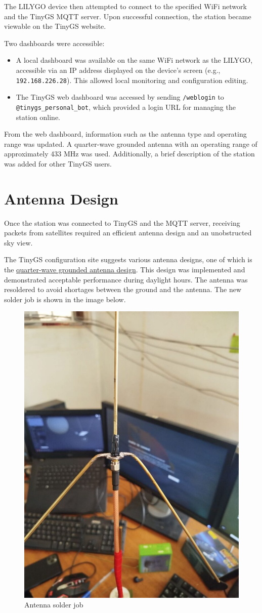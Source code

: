 \documentclass[12pt,a4paper]{article}
\begin{document}
The LILYGO device then attempted to connect to the specified WiFi network and the TinyGS MQTT server. Upon successful connection, the station became viewable on the TinyGS website.

Two dashboards were accessible:
\begin{itemize}
    \item A local dashboard was available on the same WiFi network as the LILYGO, accessible via an IP address displayed on the device's screen (e.g., \texttt{192.168.226.28}). This allowed local monitoring and configuration editing.
    \item The TinyGS web dashboard was accessed by sending \texttt{/weblogin} to \texttt{@tinygs\_personal\_bot}, which provided a login URL for managing the station online.
\end{itemize}

From the web dashboard, information such as the antenna type and operating range was updated. A quarter-wave grounded antenna with an operating range of approximately 433 MHz was used. Additionally, a brief description of the station was added for other TinyGS users.

\section{Antenna Design}
Once the station was connected to TinyGS and the MQTT server, receiving packets from satellites required an efficient antenna design and an unobstructed sky view.

The TinyGS configuration site suggests various antenna designs, one of which is the \href{http://www.n1gy.com/simple-ground-plane-antennas.html}{quarter-wave grounded antenna design}. This design was implemented and demonstrated acceptable performance during daylight hours. The antenna was resoldered to avoid shortages between the ground and the antenna. The new solder job is shown in the image below.
\begin{figure}[H]
    \centering
    \includegraphics[height=0.5\textwidth]{../images/antennaeRedesign.jpg}
    \caption{Antenna solder job}
    \label{fig:antenna_solder_job}
\end{figure}
\end{document}
